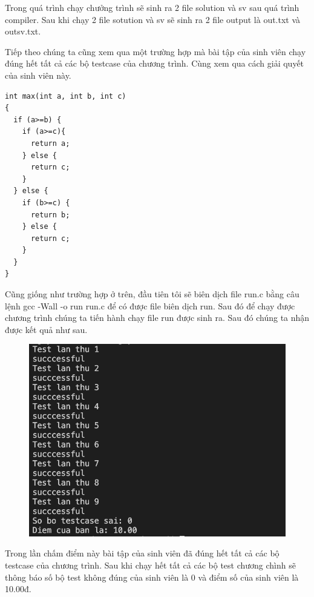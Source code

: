 \documentclass[12pt,a4paper]{article}
\begin{document}
Trong quá trình chạy chưởng trình sẽ sinh ra 2 file solution và sv sau quá trình compiler. Sau khi chạy 2 file sotution và sv sẽ sinh ra 2 file output là out.txt và outsv.txt.

Tiếp theo chúng ta cũng xem qua một trường hợp mà bài tập của sinh viên chạy đúng hết tất cả các bộ testcase của chương trình. Cùng xem qua cách giải quyết của sinh viên này.

\begin{lstlisting}
int max(int a, int b, int c) 
{ 
  if (a>=b) {
    if (a>=c){
      return a;
    } else {
      return c;
    } 
  } else {
    if (b>=c) {
      return b;
    } else {
      return c;  
    }
  }
}
\end{lstlisting}

Cũng giống như trường hợp ở trên, đầu tiên tôi sẽ biên dịch file run.c bằng câu lệnh gcc -Wall -o run run.c để có được file biên dịch run. Sau đó để chạy được chương trình chúng ta tiến hành chạy file run được sinh ra. Sau đó chúng ta nhận được kết quả như sau.

\begin{figure}[ht]
\begin{center}
\includegraphics[scale=.3]{hinhanh/ketquademodung.png}
\end{center}
\end{figure}

Trong lần chấm điểm này bài tập của sinh viên đã đúng hết tất cả các bộ testcase của chương trình. Sau khi chạy hết tất cả các bộ test chương chình sẽ thông báo số bộ test không đúng của sinh viên là 0 và điểm số của sinh viên là 10.00đ.
\end{document}
